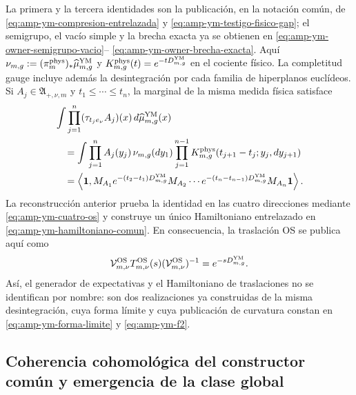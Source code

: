 La primera y la tercera identidades son la publicación, en la notación
común, de \eqref{eq:amp-ym-compresion-entrelazada} y
\eqref{eq:amp-ym-testigo-fisico-gap}; el semigrupo, el vacío simple y la
brecha exacta ya se obtienen en
\eqref{eq:amp-ym-owner-semigrupo-vacio}--
\eqref{eq:amp-ym-owner-brecha-exacta}. Aquí
$\nu_{m,g}:=(\pi_m^{\rm phys})_*\widehat\mu_{m,g}^{\rm YM}$ y
$K_{m,g}^{\rm phys}(t)=e^{-tD_{m,g}^{\rm YM}}$ en el cociente físico.
La completitud gauge incluye además la desintegración por cada familia de
hiperplanos euclídeos. Si $A_j\in\mathfrak A_{+,\nu,m}$ y
$t_1\le\cdots\le t_n$, la marginal de la misma medida física satisface
\begin{equation}\label{eq:pdf2-g-gau-transfer-euclidean-dato}
\begin{aligned}
 &\int\prod_{j=1}^n
   (\tau_{t_je_\nu}A_j)(x)\,d\widehat\mu_{m,g}^{\rm YM}(x)\\
 &\quad=
 \int\prod_{j=1}^nA_j(y_j)\,
  \nu_{m,g}(dy_1)
  \prod_{j=1}^{n-1}K_{m,g}^{\rm phys}
       (t_{j+1}-t_j;y_j,dy_{j+1})\\
 &\quad=
 \left\langle\mathbf1,
  M_{A_1}e^{-(t_2-t_1)D_{m,g}^{\rm YM}}M_{A_2}\cdots
  e^{-(t_n-t_{n-1})D_{m,g}^{\rm YM}}M_{A_n}\mathbf1
 \right\rangle.
\end{aligned}
\end{equation}
La reconstrucción anterior prueba la identidad en las cuatro direcciones
mediante \eqref{eq:amp-ym-cuatro-os} y construye un único Hamiltoniano
entrelazado en \eqref{eq:amp-ym-hamiltoniano-comun}. En consecuencia, la
traslación OS se publica aquí como
\begin{equation}\label{eq:pdf2-g-gau-os-generator-dato}
 \mathcal V_{m,\nu}^{\rm OS}T_{m,\nu}^{\rm OS}(s)
 (\mathcal V_{m,\nu}^{\rm OS})^{-1}
 =e^{-sD_{m,g}^{\rm YM}}.
\end{equation}
Así, el generador de expectativas y el Hamiltoniano de traslaciones no se
identifican por nombre: son dos realizaciones ya construidas de la misma
desintegración, cuya forma límite y cuya publicación de curvatura constan en
\eqref{eq:amp-ym-forma-limite} y \eqref{eq:amp-ym-f2}.

\subsection{Coherencia cohomológica del constructor común y emergencia de la clase global}


